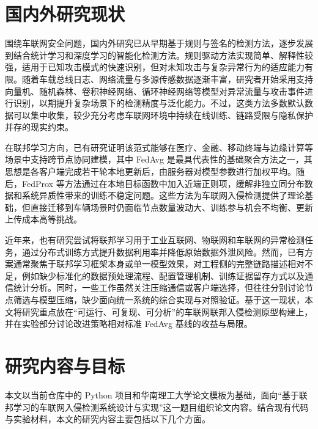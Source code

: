 \section{国内外研究现状}
\label{sec:introduction-related-work}

围绕车联网安全问题，国内外研究已从早期基于规则与签名的检测方法，逐步发展到结合统计学习和深度学习的智能化检测方法。规则驱动方法实现简单、解释性较强，适用于已知攻击模式的快速识别，但对未知攻击与复杂异常行为的适应能力有限。随着车载总线日志、网络流量与多源传感数据逐渐丰富，研究者开始采用支持向量机、随机森林、卷积神经网络、循环神经网络等模型对异常流量与攻击事件进行识别，以期提升复杂场景下的检测精度与泛化能力\cite{placeholder_ml_ids_survey,placeholder_deep_ids_survey}。不过，这类方法多数默认数据可以集中收集，较少充分考虑车联网环境中持续在线训练、链路受限与隐私保护并存的现实约束。

在联邦学习方向，已有研究证明该范式能够在医疗、金融、移动终端与边缘计算等场景中支持跨节点协同建模，其中 FedAvg 是最具代表性的基础聚合方法之一，其思想是各客户端完成若干轮本地更新后，由服务器对模型参数进行加权平均\cite{placeholder_fedavg,placeholder_federated_learning_survey}。随后，FedProx 等方法通过在本地目标函数中加入近端正则项，缓解非独立同分布数据和系统异质性带来的训练不稳定问题\cite{placeholder_fedprox}。这些方法为车联网入侵检测提供了理论基础，但直接迁移到车辆场景时仍面临节点数量波动大、训练参与机会不均衡、更新上传成本高等挑战。

近年来，也有研究尝试将联邦学习用于工业互联网、物联网和车联网的异常检测任务，通过分布式训练方式提升数据利用率并降低原始数据外泄风险\cite{placeholder_iov_fl_ids,placeholder_edge_security_fl}。然而，已有方案通常聚焦于联邦学习框架本身或单一模型效果，对工程侧的完整链路描述相对不足，例如缺少标准化的数据预处理流程、配置管理机制、训练证据留存方式以及通信统计分析。同时，一些工作虽然关注压缩通信或客户端选择，但往往分别讨论节点筛选与模型压缩，缺少面向统一系统的综合实现与对照验证。基于这一现状，本文将研究重点放在“可运行、可复现、可分析”的车联网联邦入侵检测原型构建上，并在实验部分讨论改进策略相对标准 FedAvg 基线的收益与局限。

\section{研究内容与目标}
\label{sec:introduction-objective}

本文以当前仓库中的 Python 项目和华南理工大学论文模板为基础，面向“基于联邦学习的车联网入侵检测系统设计与实现”这一题目组织论文内容。结合现有代码与实验材料，本文的研究内容主要包括以下几个方面。

